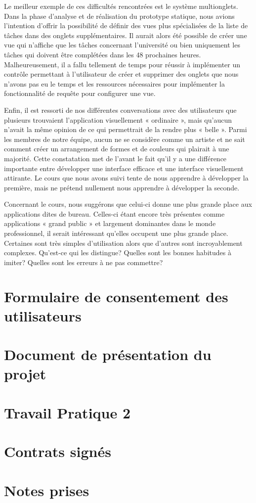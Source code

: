 \documentclass[letterpaper, oneside, 12pt, these, creativecommons]{thETS}
\begin{document}
Le meilleur exemple de ces difficultés rencontrées est le système multionglets. Dans la phase d'analyse et de réalisation du prototype statique, nous avions l'intention d'offrir la possibilité de définir des vues plus spécialisées de la liste de tâches dans des onglets supplémentaires. Il aurait alors été possible de créer une vue qui n'affiche que les tâches concernant l'université ou bien uniquement les tâches qui doivent être complétées dans les 48 prochaines heures. Malheureusement, il a fallu tellement de temps pour réussir à implémenter un contrôle permettant à l'utilisateur de créer et supprimer des onglets que nous n'avons pas eu le temps et les ressources nécessaires pour implémenter la fonctionnalité de requête pour configurer une vue.

Enfin, il est ressorti de nos différentes conversations avec des utilisateurs que plusieurs trouvaient l'application visuellement « ordinaire », mais qu'aucun n'avait la même opinion de ce qui permettrait de la rendre plus « belle ». Parmi les membres de notre équipe, aucun ne se considère comme un artiste et ne sait comment créer un arrangement de formes et de couleurs qui plairait à une majorité. Cette constatation met de l'avant le fait qu'il y a une différence importante entre développer une interface efficace et une interface visuellement attirante. Le cours que nous avons suivi tente de nous apprendre à développer la première, mais ne prétend nullement nous apprendre à développer la seconde.

Concernant le cours, nous suggérons que celui-ci donne une plus grande place aux applications dites de bureau. Celles-ci étant encore très présentes comme applications « grand public » et largement dominantes dans le monde professionnel, il serait intéressant qu'elles occupent une plus grande place. Certaines sont très simples d'utilisation alors que d'autres sont incroyablement complexes. Qu'est-ce qui les distingue? Quelles sont les bonnes habitudes à imiter? Quelles sont les erreurs à ne pas commettre?

\appendix
\multiannexe

\chapter{Formulaire de consentement des utilisateurs}



\chapter{Document de présentation du projet}



\chapter{Travail Pratique 2}



\chapter{Contrats signés}


\chapter{Notes prises}

\end{document}
